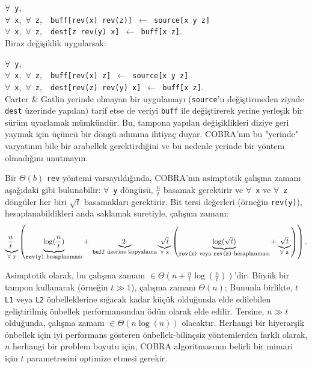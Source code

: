 \documentclass[10pt]{article}
\begin{document}
\noindent $\forall$~{\tt y},\\
\mbox{} \quad $\forall$~{\tt x},~$\forall$~{\tt z},~{\tt
  buff[rev(x)~rev(z)]~$\gets$~source[x~y~z]}\\
\mbox{} \quad $\forall$~{\tt x},~$\forall$~{\tt z},~{\tt
  dest[z~rev(y)~x]~$\gets$~buff[x~z]}.\\

\noindent Biraz de\u{g}i\c{s}iklik uygularsak:

\noindent $\forall$~{\tt y},\\
\mbox{} \quad $\forall$~{\tt x},~$\forall$~{\tt z},~{\tt
  buff[rev(x)~z]~$\gets$~source[x~y~z]}\\
\mbox{} \quad $\forall$~{\tt x},~$\forall$~{\tt z},~{\tt
  dest[rev(z)~rev(y)~x]~$\gets$~buff[x~z]}.\\

Carter \& Gatlin yerinde olmayan bir uygulamay{\i} ({\tt source}'u 
de\u{g}i\c{s}tirmeden ziyade {\tt dest} \"{u}zerinde yap{\i}lan) tarif 
etse de veriyi {\tt buff} ile de\u{g}i\c{s}tirerek yerine yerle\c{s}ik bir 
s\"{u}r\"{u}m uyarlamak m\"{u}mk\"{u}nd\"{u}r. Bu, tampona yap{\i}lan de\u{g}i\c{s}iklikleri 
diziye geri yaymak i\c{c}in \"{u}\c{c}\"{u}nc\"{u} bir d\"{o}ng\"{u} ad{\i}m{\i}na ihtiya\c{c} duyar. 
COBRA'n{\i}n bu "yerinde" varyat{\i}n{\i}n bile bir arabellek gerektirdi\u{g}ini ve bu 
nedenle yerinde bir y\"{o}ntem olmad{\i}\u{g}{\i}n{\i} unutmay{\i}n.

Bir $\Theta(b)$ {\tt rev} y\"{o}ntemi varsay{\i}ld{\i}\u{g}{\i}nda, COBRA'n{\i}n asimptotik 
\c{c}al{\i}\c{s}ma zaman{\i} a\c{s}a\u{g}{\i}daki gibi bulunabilir: $\forall$~{\tt y} d\"{o}ng\"{u}s\"{u},
$\frac{n}{t}$ basamak gerektirir ve $\forall$~{\tt x} ve $\forall$~{\tt z}
d\"{o}ng\"{u}ler her biri $\sqrt{t}$ basamaklar{\i} gerektirir. Bit tersi de\u{g}erleri 
(\"{o}rne\u{g}in {\tt rev(y)}), hesaplanabildikleri anda saklamak suretiyle, \c{c}al{\i}\c{s}ma zaman{\i}:
\[
\underbrace{\frac{n}{t} \cdot }_{\forall~{\tt y}} \left( \underbrace{ \log(\frac{n}{t}) }_{\mbox{\footnotesize {\tt rev(y)} hesaplanmas{\i}}} +~ \underbrace{2 \cdot}_{\mbox{\footnotesize {\tt buff} \"{u}zerine kopyalama}} \underbrace{\sqrt{t}}_{\forall~{\tt x}} \left(
\underbrace{\log(\sqrt{t})}_{\mbox{\footnotesize {\tt rev(x)} veya {\tt rev(z)} hesaplanmas{\i}}} + \underbrace{\sqrt{t}}_{\forall~{\tt z}} \right) \right).
\]

Asimptotik olarak, bu \c{c}al{\i}\c{s}ma zaman{\i} $\in \Theta\left( n + \frac{n}{t}
\log(\frac{n}{t}) \right)$'dir. B\"{u}y\"{u}k bir tampon kullanarak (\"{o}rne\u{g}in $t \gg 1$),
\c{c}al{\i}\c{s}ma zaman{\i} $\Theta\left( n\right)$; Bununla birlikte, $t$ {\tt L1} veya {\tt L2} 
\"{o}nbelleklerine s{\i}\u{g}acak kadar k\"{u}\c{c}\"{u}k oldu\u{g}unda elde edilebilen geli\c{s}tirilmi\c{s} 
\"{o}nbellek performans{\i}ndan \"{o}d\"{u}n olarak elde edilir. Tersine, $n \gg t$ oldu\u{g}unda, 
\c{c}al{\i}\c{s}ma zaman{\i} $\in \Theta(n \log(n))$ olacakt{\i}r. Herhangi bir hiyerar\c{s}ik \"{o}nbellek 
i\c{c}in iyi performans g\"{o}steren \"{o}nbellek-bilin\c{c}siz y\"{o}ntemlerden farkl{\i} olarak,
$n$ herhangi bir problem boyutu i\c{c}in, COBRA algoritmas{\i}n{\i}n belirli bir 
mimari i\c{c}in $t$ parametresini optimize etmesi gerekir.
\end{document}
